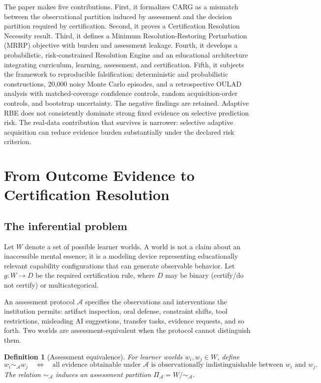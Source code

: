 \documentclass[11pt]{article}
\newtheorem{definition}{Definition}
\newcommand{\cA}{\mathcal{A}}
\begin{document}
The paper makes five contributions. First, it formalizes CARG as a mismatch between the observational partition induced by assessment and the decision partition required by certification. Second, it proves a Certification Resolution Necessity result. Third, it defines a Minimum Resolution-Restoring Perturbation (MRRP) objective with burden and assessment leakage. Fourth, it develops a probabilistic, risk-constrained Resolution Engine and an educational architecture integrating curriculum, learning, assessment, and certification. Fifth, it subjects the framework to reproducible falsification: deterministic and probabilistic constructions, 20,000 noisy Monte Carlo episodes, and a retrospective OULAD analysis with matched-coverage confidence controls, random acquisition-order controls, and bootstrap uncertainty. The negative findings are retained. Adaptive RBE does not consistently dominate strong fixed evidence on selective prediction risk. The real-data contribution that survives is narrower: selective adaptive acquisition can reduce evidence burden substantially under the declared risk criterion.

\section{From Outcome Evidence to Certification Resolution}
\subsection{The inferential problem}
Let $W$ denote a set of possible learner worlds. A world is not a claim about an inaccessible mental essence; it is a modeling device representing educationally relevant capability configurations that can generate observable behavior. Let $g:W\to D$ be the required certification rule, where $D$ may be binary (certify/do not certify) or multicategorical.

An assessment protocol $\cA$ specifies the observations and interventions the institution permits: artifact inspection, oral defense, constraint shifts, tool restrictions, misleading AI suggestions, transfer tasks, evidence requests, and so forth. Two worlds are assessment-equivalent when the protocol cannot distinguish them.

\begin{definition}[Assessment equivalence]
For learner worlds $w_i,w_j\in W$, define
\[
 w_i\sim_{\cA}w_j
 \quad\Longleftrightarrow\quad
 \text{all evidence obtainable under }\cA\text{ is observationally indistinguishable between }w_i\text{ and }w_j.
\]
The relation $\sim_{\cA}$ induces an assessment partition $\Pi_{\cA}=W/\!\sim_{\cA}$.
\end{definition}
\end{document}
